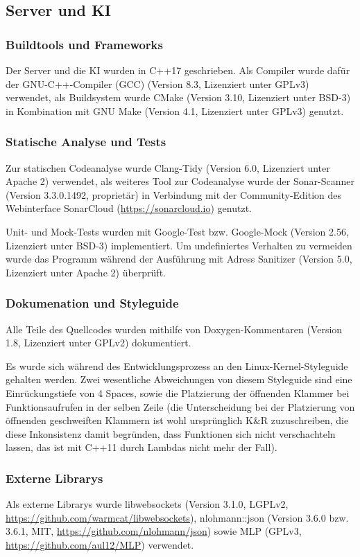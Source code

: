 \subsection{Server und KI}
\subsubsection{Buildtools und Frameworks}
Der Server und die KI wurden in C++17 geschrieben.
Als Compiler wurde dafür der GNU-C++-Compiler (GCC) (Version 8.3, Lizenziert unter GPLv3) verwendet,
als Buildsystem wurde CMake (Version 3.10, Lizenziert unter BSD-3) in Kombination mit GNU Make (Version 4.1, Lizenziert unter GPLv3) genutzt.

\subsubsection{Statische Analyse und Tests}
Zur statischen Codeanalyse wurde Clang-Tidy (Version 6.0, Lizenziert unter Apache 2) verwendet,
als weiteres Tool zur Codeanalyse wurde der Sonar-Scanner (Version 3.3.0.1492, proprietär) in Verbindung mit der Community-Edition des Webinterface SonarCloud (\url{https://sonarcloud.io}) genutzt.

Unit- und Mock-Tests wurden mit Google-Test bzw. Google-Mock (Version 2.56, Lizenziert unter BSD-3) implementiert.
Um undefiniertes Verhalten zu vermeiden wurde das Programm während der Ausführung mit Adress Sanitizer (Version 5.0, Lizenziert unter Apache 2) überprüft.

\subsubsection{Dokumenation und Styleguide}
Alle Teile des Quellcodes wurden mithilfe von Doxygen-Kommentaren (Version 1.8, Lizenziert unter GPLv2) dokumentiert.

Es wurde sich während des Entwicklungsprozess an den Linux-Kernel-Styleguide gehalten werden. 
Zwei wesentliche Abweichungen von diesem Styleguide sind eine Einrückungstiefe von 4 Spaces, sowie die Platzierung der öffnenden Klammer bei Funktionsaufrufen in der selben Zeile 
(die Unterscheidung bei der Platzierung von öffnenden geschweiften Klammern ist wohl ursprünglich K\&R zuzuschreiben, die diese Inkonsistenz damit begründen, 
dass Funktionen sich nicht verschachteln lassen, das ist mit C++11 durch Lambdas nicht mehr der Fall).

\subsubsection{Externe Librarys}
Als externe Librarys wurde libwebsockets (Version 3.1.0, LGPLv2, \url{https://github.com/warmcat/libwebsockets}), 
nlohmann::json (Version 3.6.0 bzw. 3.6.1, MIT, \url{https://github.com/nlohmann/json}) sowie MLP (GPLv3, \url{https://github.com/aul12/MLP}) verwendet.


